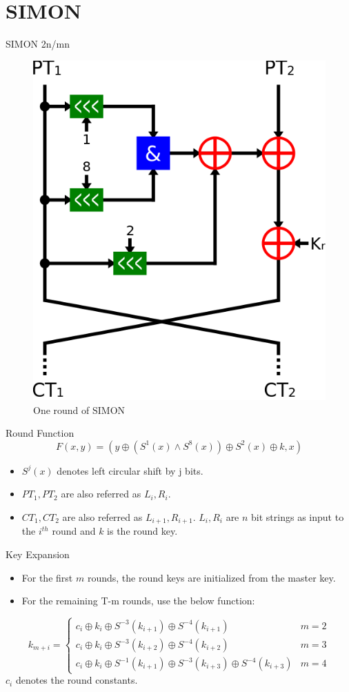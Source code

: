 \section{SIMON}

\begin{frame}{SIMON 2n/mn }
\begin{figure}[h!]
    \centering
    \includegraphics[width=0.3\linewidth]{simon/simon.png}
    \caption{One round of SIMON \cite{wiki:simon}}
    \label{fig:ors}
\end{figure}
\pause
\begin{block}{Round Function}
\begin{equation}\label{eq:simonfun}
    F(x,y) = (y\oplus (S^1(x)\wedge S^8(x)) \oplus S^2(x) \oplus k, x)
\end{equation}
\end{block}
\pause
\begin{itemize}
    \item $S^j(x)$ denotes left circular shift by j bits.
    \pause
    \item $PT_1, PT_2$ are also referred as $L_i, R_i$.
    \pause
    \item $CT_1, CT_2$ are also referred as $L_{i+1}, R_{i+1}$. $L_i, R_i$ are $n$ bit strings as input to the $i^{th}$ round and $k$ is the round key.
\end{itemize}
\end{frame}
\begin{frame}{Key Expansion}
    \begin{itemize}
        \item For the first $m$ rounds, the round keys are initialized from the master key.
        \pause
        \item For the remaining T-m rounds, use the below function:
    \end{itemize}
    \begin{equation}
 k_{m+i} = 
 \begin{cases} 
      c_i \oplus k_i \oplus S^{-3}(k_{i+1}) \oplus S^{-4}(k_{i+1}) &  m = 2 \\
      c_i \oplus k_i \oplus S^{-3}(k_{i+2}) \oplus S^{-4}(k_{i+2}) &  m = 3 \\
      c_i \oplus k_i \oplus S^{-1}(k_{i+1}) \oplus S^{-3}(k_{i+3}) \oplus S^{-4}(k_{i+3}) &  m = 4
  \end{cases}
\end{equation}
$c_i$ denotes the round constants.
\end{frame}